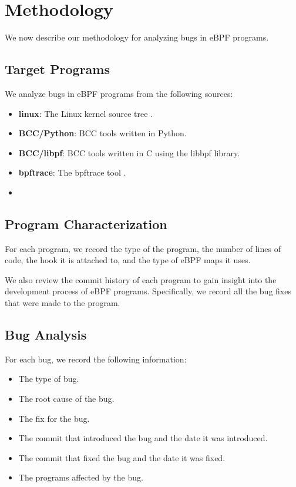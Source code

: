 \section{Methodology}

We now describe our methodology for analyzing bugs in eBPF programs.

\subsection{Target Programs}

We analyze bugs in eBPF programs from the following sources:
\begin{itemize}
    \item \textbf{linux}: The Linux kernel source tree \todo{}.
    \item \textbf{BCC/Python}: BCC tools written in Python.
    \item \textbf{BCC/libpf}: BCC tools written in C using the libbpf library. \todo{}
    \item \textbf{bpftrace}: The bpftrace tool \todo{}.
    \item {}
\end{itemize}

\subsection{Program Characterization}
For each program, we record the type of the program, the number of lines of code, the hook it is attached to, and the type of eBPF maps it uses. 

We also review the commit history of each program to gain insight into the development process of eBPF programs. Specifically, we record all the bug fixes that were made to the program. 

\subsection{Bug Analysis}
For each bug, we record the following information:
\begin{itemize}
    \item The type of bug.
    \item The root cause of the bug.
    \item The fix for the bug.
    \item The commit that introduced the bug and the date it was introduced.
    \item The commit that fixed the bug and the date it was fixed.
    \item The programs affected by the bug.
\end{itemize}

